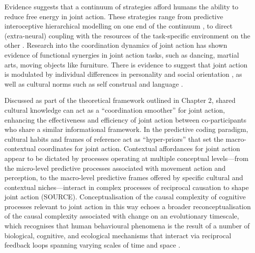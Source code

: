 \begin{CJK}{UTF8}{gbsn}
Evidence suggests that a continuum of strategies afford humans the ability to reduce free energy in joint action.  These strategies range
from predictive interoceptive hierarchical modelling on one end of the continuum \citep{Pesquita2017}, to direct (extra-neural) coupling with the resources of the task-specific environment on the other \citep{Riley2011}. Research into the coordination dynamics of joint action has shown evidence of functional synergies in joint action tasks, such as dancing, martial arts, moving objects like furniture.
There is evidence to suggest that joint action is modulated by individual differences in personality and social orientation \citep{Marsh2009,Keller2014}, as well as cultural norms such as self construal \citep{Colzato2012} and language \citep{Boroditsky2010}.


Discussed as part of the theoretical framework outlined in Chapter 2, shared cultural knowledge can act as a ``coordination smoother'' \citep{Vesper2017} for joint action, enhancing the effectiveness and efficiency of joint action between co-participants who share a similar informational framework.  In the predictive coding paradigm, cultural habits and frames of reference act as ``hyper-priors'' that set the macro-contextual coordinates for joint action\citep{Clark2013}.  Contextual affordances for joint action appear to be dictated by processes operating at multiple conceptual levels---from the micro-level predictive processes associated with movement action and perception, to the macro-level predictive frames offered by specific cultural and contextual niches---interact in complex processes of reciprocal causation to shape joint action (SOURCE).  Conceptualisation of the causal complexity of cognitive processes relevant to joint action in this way echoes a broader reconceptualisation of the causal complexity associated with change on an evolutionary timescale, which recognises that human behavioural phenomena is the result of a number of biological, cognitive, and ecological mechanisms that interact via reciprocal feedback loops spanning varying scales of time and space \citep{Fuentes2015}.



\end{CJK}
